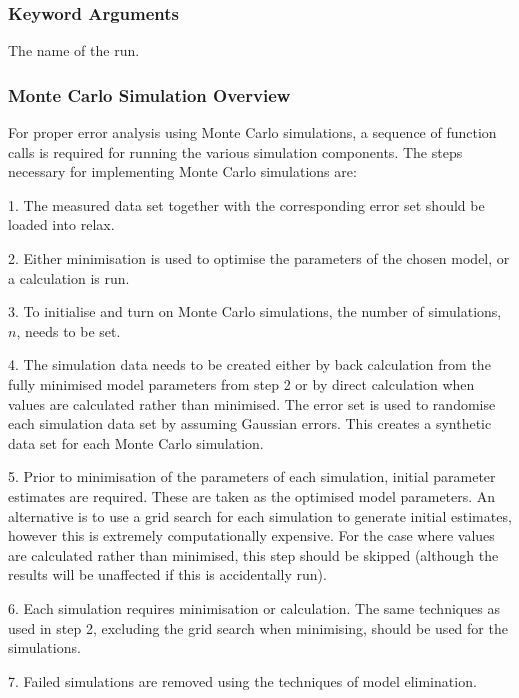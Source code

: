 \subsubsection{Keyword Arguments}

  The name of the run. 




\subsubsection{Monte Carlo Simulation Overview}

For proper error analysis using Monte Carlo simulations, a sequence of function calls is required for running the various simulation components.  The steps necessary for implementing Monte Carlo simulations are:


1.  The measured data set together with the corresponding error set should be loaded into relax.


2.  Either minimisation is used to optimise the parameters of the chosen model, or a calculation is run.


3.  To initialise and turn on Monte Carlo simulations, the number of simulations, $n$, needs to be set.


4.  The simulation data needs to be created either by back calculation from the fully minimised model parameters from step 2 or by direct calculation when values are calculated rather than minimised.  The error set is used to randomise each simulation data set by assuming Gaussian errors.  This creates a synthetic data set for each Monte Carlo simulation.


5.  Prior to minimisation of the parameters of each simulation, initial parameter estimates are required.  These are taken as the optimised model parameters.  An alternative is to use a grid search for each simulation to generate initial estimates, however this is extremely computationally expensive.  For the case where values are calculated rather than minimised, this step should be skipped (although the results will be unaffected if this is accidentally run).


6.  Each simulation requires minimisation or calculation.  The same techniques as used in step 2, excluding the grid search when minimising, should be used for the simulations.


7.  Failed simulations are removed using the techniques of model elimination.


